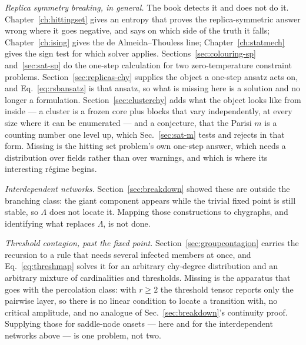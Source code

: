 \emph{Replica symmetry breaking, in general.} The book detects it and does not
do it. Chapter~\ref{ch:hittingset} gives an entropy that proves the
replica-symmetric answer wrong where it goes negative, and says on which side of
the truth it falls; Chapter~\ref{ch:ising} gives the de Almeida--Thouless line;
Chapter~\ref{ch:statmech} gives the sign test for which solver applies.
Sections~\ref{sec:colouring-sp} and~\ref{sec:sat-sp} do the one-step
calculation for two zero-temperature constraint problems.
Section~\ref{sec:replicas-chy} supplies the object a one-step ansatz acts on,
and Eq.~\eqref{eq:rsbansatz} is that ansatz, so what is missing here is a
solution and no longer a formulation. Section~\ref{sec:clusterchy} adds what
the object looks like from inside --- a cluster is a frozen core plus blocks
that vary independently, at every size where it can be enumerated --- and a
conjecture, that the Parisi $m$ is a counting number one level up, which
Sec.~\ref{sec:sat-m} tests and rejects in that form. Missing is the hitting
set problem's own one-step answer, which needs a distribution over fields rather
than over warnings, and which is where its interesting r\'egime begins.

\emph{Interdependent networks.} Section~\ref{sec:breakdown} showed these are
outside the branching class: the giant component appears while the trivial fixed
point is still stable, so $\Lambda$ does not locate it. Mapping those
constructions to chygraphs, and identifying what replaces $\Lambda$, is not
done.

\emph{Threshold contagion, past the fixed point.}
Section~\ref{sec:groupcontagion} carries the recursion to a rule that needs
several infected members at once, and Eq.~\eqref{eq:threshmap} solves it for an
arbitrary chy-degree distribution and an arbitrary mixture of cardinalities and
thresholds. Missing is the apparatus that goes with the percolation class: with
$r\ge2$ the threshold tensor reports only the pairwise layer, so there is no
linear condition to locate a transition with, no critical amplitude, and no
analogue of Sec.~\ref{sec:breakdown}'s continuity proof. Supplying those for
saddle-node onsets --- here and for the interdependent networks above --- is one
problem, not two.

